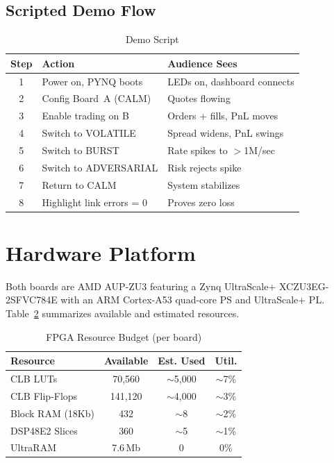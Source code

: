 \documentclass[conference]{IEEEtran}
\begin{document}
\subsection{Scripted Demo Flow}

\begin{table}[h]
\centering
\caption{Demo Script}
\label{tab:demo}
\begin{tabular}{@{}cL{2.5cm}L{3.5cm}@{}}
\toprule
\textbf{Step} & \textbf{Action} & \textbf{Audience Sees} \\
 & Power on, PYNQ boots & LEDs on, dashboard connects \\
2 & Config Board~A (CALM) & Quotes flowing \\
3 & Enable trading on B & Orders + fills, PnL moves \\
4 & Switch to VOLATILE & Spread widens, PnL swings \\
5 & Switch to BURST & Rate spikes to $>$1M/sec \\
6 & Switch to ADVERSARIAL & Risk rejects spike \\
7 & Return to CALM & System stabilizes \\
8 & Highlight link errors = 0 & Proves zero loss \\
\bottomrule
\end{tabular}
\end{table}

\section{Hardware Platform}

Both boards are AMD AUP-ZU3 featuring a Zynq UltraScale+ XCZU3EG-2SFVC784E with an ARM Cortex-A53 quad-core PS and UltraScale+ PL. Table~\ref{tab:resources} summarizes available and estimated resources.

\begin{table}[h]
\centering
\caption{FPGA Resource Budget (per board)}
\label{tab:resources}
\begin{tabular}{@{}lccc@{}}
\toprule
\textbf{Resource} & \textbf{Available} & \textbf{Est. Used} & \textbf{Util.} \\
\midrule
CLB LUTs       & 70,560  & $\sim$5,000 & $\sim$7\% \\
CLB Flip-Flops & 141,120 & $\sim$4,000 & $\sim$3\% \\
Block RAM (18Kb)& 432    & $\sim$8     & $\sim$2\% \\
DSP48E2 Slices & 360     & $\sim$5     & $\sim$1\% \\
UltraRAM       & 7.6\,Mb & 0           & 0\% \\
\bottomrule
\end{tabular}
\end{table}
\end{document}
